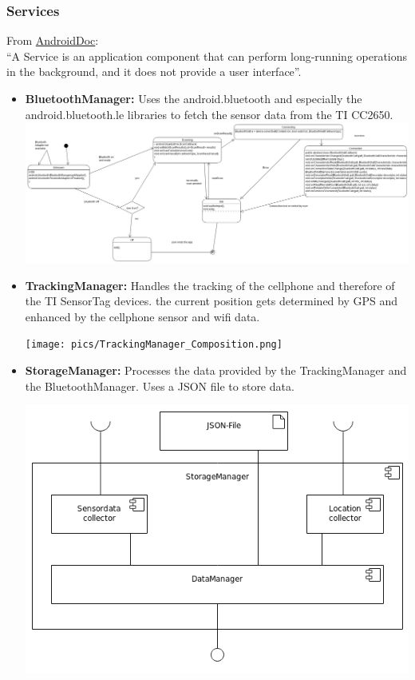 \subsubsection{Services}
From \href{https://developer.android.com/guide/components/services.html}{AndroidDoc}: \\
``A Service is an application component that can perform long-running operations in the background, and it does not provide a user interface''.
\begin{itemize}
  \item \textbf{BluetoothManager:} Uses the android.bluetooth and especially the android.bluetooth.le libraries to fetch the sensor data from the TI CC2650. \\
  \includegraphics[scale=0.2]{pics/bt_state.png}
  \item \textbf{TrackingManager:} Handles the tracking of the cellphone and therefore of the TI SensorTag devices. the current position gets determined by GPS and enhanced by the cellphone sensor and wifi data.
  \begin{center}
  \texttt{[image: pics/TrackingManager\_Composition.png]}
  \end{center}

  \item \textbf{StorageManager:} Processes the data provided by the TrackingManager and the BluetoothManager. Uses a JSON file to store data.
  \begin{center}
  	\includegraphics[scale=0.4]{pics/StorageMgr_Composition.png}
  \end{center}


\end{itemize}
